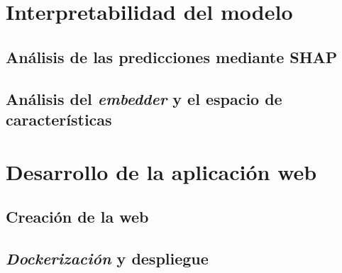 \section{Interpretabilidad del modelo}
\subsection{Análisis de las predicciones mediante SHAP}
\subsection{Análisis del \textit{embedder} y el espacio de características}

\section{Desarrollo de la aplicación web}

\subsection{Creación de la web}

\subsection{\textit{Dockerización} y despliegue}
 